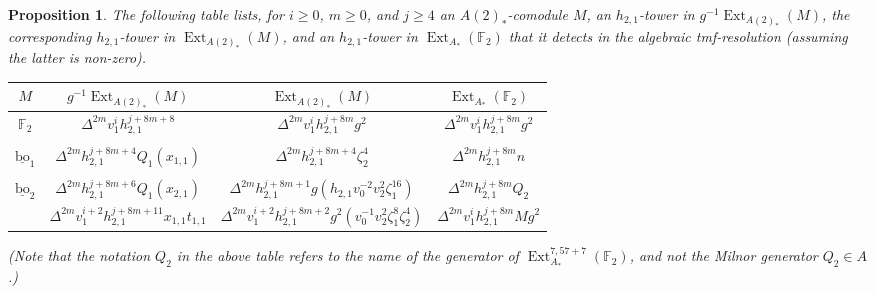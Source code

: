 \documentclass[10pt]{amsart}
\newcommand{\ul}[1]{\underline{#1}}
\newcommand{\FF}{\mathbb{F}}
\newcommand{\bo}{\mathrm{bo}}
\newcommand{\bou}{\ul{\bo}}
\newtheorem{prop}[equation]{Proposition}
\theoremstyle{definition}
\numberwithin{equation}{section}
\numberwithin{figure}{section}
\DeclareMathOperator{\Ext}{Ext}
\begin{document}
\begin{prop}\label{prop:h21detection}
The following table lists, for $i \ge 0$, $m \ge 0$, and $j \ge 4$ an $A(2)_*$-comodule $M$, an $h_{2,1}$-tower in $g^{-1}\Ext_{A(2)_*}(M)$, the corresponding $h_{2,1}$-tower in $\Ext_{A(2)_*}(M)$, and an $h_{2,1}$-tower in $\Ext_{A_*}(\FF_2)$ that it detects in the algebraic tmf-resolution (assuming the latter is non-zero). 
\begin{center}
\begin{tabular}{c|c|c|c}
$M$ & $g^{-1}\Ext_{A(2)_*}(M)$ & $\Ext_{A(2)_*}(M)$ & $\Ext_{A_*}(\FF_2)$ \\
\hline
$\FF_2$ & $\Delta^{2m} v_1^i h^{j+8m+8}_{2,1}$ & 
$\Delta^{2m} v_1^i h^{j+8m}_{2,1} g^2$ &$\Delta^{2m} v_1^i h_{2,1}^{j+8m} g^2$ \\
&&&\\
$\bou_1$ & $\Delta^{2m} h^{j+8m+4}_{2,1} Q_1(x_{1,1})$ & $\Delta^{2m} h_{2,1}^{j+8m+4}\zeta_2^4$ & $\Delta^{2m}h_{2,1}^{j+8m} n$ \\
&&&\\
$\bou_2$ & $\Delta^{2m}h_{2,1}^{j+8m+6} Q_1(x_{2,1})$ & $\Delta^{2m}h^{j+8m+1}_{2,1} g(h_{2,1}v_0^{-2}v_2^2\zeta_1^{16})$ & $\Delta^{2m}h_{2,1}^{j+8m} Q_2$ \\
 & $\Delta^{2m}v_1^{i+2} h_{2,1}^{j+8m+11}x_{1,1}t_{1,1}$ & $\Delta^{2m} v_1^{i+2}h^{j+8m+2}_{2,1}g^2(v_0^{-1}v_2^2\zeta_1^8\zeta_2^4)$ & $\Delta^{2m}v_1^i h_{2,1}^{j+8m} Mg^2$ \\
\hline
\end{tabular}
\end{center}
(Note that the notation $Q_2$ in the above table refers to the name of the generator of $\Ext^{7,57+7}_{A_*}(\FF_2)$, and \emph{not} the Milnor generator $Q_2 \in A$.) 
\end{prop}
\end{document}
